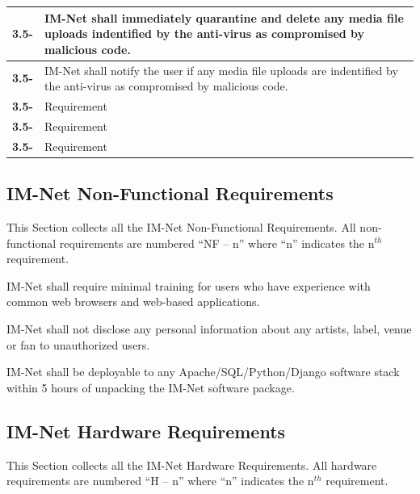 \documentclass[letterpaper,12pt]{article}
\newcounter{qcounter}						%
\newcounter{rcounter}						%
\newcommand\rnumber{\stepcounter{rcounter}\arabic{rcounter}}
\begin{document}
{\begin{center}
\begin{tabular}{|l|p{6in}|}
\hline
\textbf{3.5-\rnumber} & IM-Net shall immediately quarantine and delete any media file uploads indentified by the anti-virus as compromised by malicious code. \\ 
\hline
\textbf{3.5-\rnumber} & IM-Net shall notify the user if any media file uploads are indentified by the anti-virus as compromised by malicious code. \\ 
\hline
\textbf{3.5-\rnumber} & Requirement \\ 
\hline
\textbf{3.5-\rnumber} & Requirement \\ 
\hline
\textbf{3.5-\rnumber} & Requirement \\ 
\hline
\end{tabular} 
\end{center}

\textcolor{subsection}{\subsection{IM-Net Non-Functional Requirements}}

This Section collects all the IM-Net Non-Functional Requirements. All non-functional requirements are numbered ``NF -- n'' where ``n'' indicates the n${}^{th}$ requirement.

\begin{list}{NF -- :~}{}

\item  IM-Net shall require minimal training for users who have experience with common web browsers and web-based applications.

\item  IM-Net shall not disclose any personal information about any artists, label, venue or fan to unauthorized users.

\item  IM-Net shall be deployable to any Apache/SQL/Python/Django software stack within 5 hours of unpacking the IM-Net software package.

\end{list}

\textcolor{subsection}{\subsection{IM-Net Hardware Requirements}}

This Section collects all the IM-Net Hardware Requirements. All hardware requirements are numbered ``H -- n'' where ``n'' indicates the n${}^{th}$ requirement.

}
\end{document}
